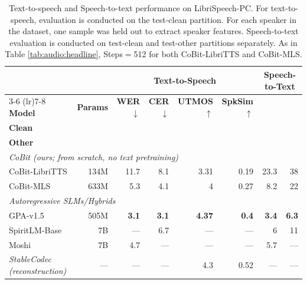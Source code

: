 \begin{table}[t]
\centering
\small
\setlength{\tabcolsep}{4.5pt}
\begin{tabular}{lrrrrrrr}
\toprule
& & \multicolumn{4}{c}{\textbf{Text-to-Speech}} & \multicolumn{2}{c}{\textbf{Speech-to-Text}} \\
\cmidrule(lr){3-6} \cmidrule(lr){7-8}
\textbf{Model} & \textbf{Params} & \textbf{WER}$\downarrow$ & \textbf{CER}$\downarrow$ & \textbf{UTMOS}$\uparrow$ & \textbf{SpkSim}$\uparrow$ & \makecell{\textbf{WER}$\downarrow$ \\ \textbf{Clean}} & \makecell{\textbf{WER}$\downarrow$ \\ \textbf{Other}} \\
\midrule
\multicolumn{8}{l}{\emph{CoBit (ours; from scratch, no text pretraining)}} \\
CoBit-LibriTTS & 134M & 11.7 & 8.1 & 3.31 & 0.19 & 23.3 & 38 \\
CoBit-MLS & 633M & 5.3 & 4.1 & 4 & 0.27 & 8.2 & 22 \\
\midrule
\multicolumn{8}{l}{\emph{Autoregressive SLMs/Hybrids}} \\
GPA-v1.5 \citep{audio:gpa} & 505M & \textbf{3.1} & \textbf{3.1} & \textbf{4.37} & \textbf{0.4} & \textbf{3.4} & \textbf{6.3} \\
SpiritLM-Base & 7B & --- & 6.7 & --- & --- & 6 & 11 \\
Moshi \citep{audio:moshi} & 7B & 4.7 & --- & --- & --- & 5.7 &  --- \\
\midrule
\emph{StableCodec (reconstruction)} & --- & --- & --- & 4.3 & 0.52 & --- & --- \\
\bottomrule
\end{tabular}
\caption{Text-to-speech and Speech-to-text performance on LibriSpeech-PC. For text-to-speech, evaluation is conducted on the test-clean partition. For each speaker in the dataset, one sample was held out to extract speaker features. Speech-to-text evaluation is conducted on test-clean and test-other partitions separately. As in Table \ref{tab:audio:headline}, Steps$=$512 for both CoBit-LibriTTS and CoBit-MLS.}
\label{tab:audio:cross-modal}
\end{table}

